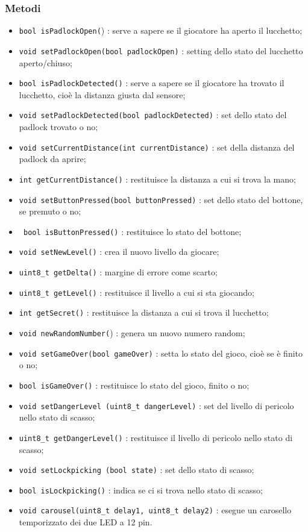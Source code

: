 \subsubsection{Metodi}
\begin{itemize}
	\item \texttt{bool isPadlockOpen(}) : serve a sapere se il giocatore ha aperto il lucchetto;
	\item \texttt{void setPadlockOpen(bool padlockOpen)} : setting dello stato del lucchetto aperto/chiuso;
	\item \texttt{bool isPadlockDetected()} : serve a sapere se il giocatore ha trovato il lucchetto, cioè la distanza giusta dal sensore;
	\item \texttt{void setPadlockDetected(bool padlockDetected)} : set dello stato del padlock trovato o no;
	\item \texttt{void setCurrentDistance(int currentDistance)} : set della distanza del padlock da aprire;
	\item \texttt{int getCurrentDistance()} : restituisce la distanza a cui si trova la mano;
	\item \texttt{void setButtonPressed(bool buttonPressed)} : set dello stato del bottone, se premuto o no;
	\item \texttt{ bool isButtonPressed()} : restituisce lo stato del bottone;
	\item \texttt{void setNewLevel()} : crea il nuovo livello da giocare;
	\item \texttt{uint8\_t getDelta()} : margine di errore come scarto;
	\item \texttt{uint8\_t getLevel()} : restituisce il livello a cui si sta giocando;
	\item \texttt{int getSecret()} : restituisce la distanza a cui si trova il lucchetto;
	\item \texttt{void newRandomNumber(}) : genera un nuovo numero random;
	\item \texttt{void setGameOver(bool gameOver)} : setta lo stato del gioco, cioè se è finito o no;
	\item \texttt{bool isGameOver()} : restituisce lo stato del gioco, finito o no;
	\item \texttt{void setDangerLevel (uint8\_t dangerLevel)} :  set del livello di pericolo nello stato di scasso;
	\item \texttt{uint8\_t getDangerLevel()} : restituisce il livello di pericolo nello stato di scasso;
	\item \texttt{void setLockpicking (bool state)} : set dello stato di scasso;
	\item \texttt{bool isLockpicking()} : indica se ci si trova nello stato di scasso;
	\item \texttt{void carousel(uint8\_t delay1, uint8\_t delay2)} : esegue un carosello temporizzato dei due LED a 12 pin.
\end{itemize}
